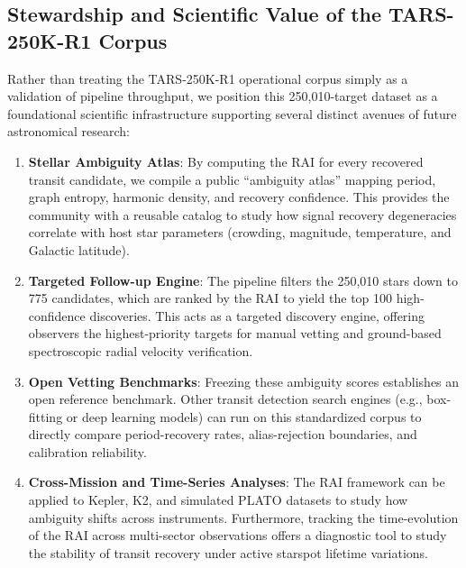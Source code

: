\subsection{Stewardship and Scientific Value of the TARS-250K-R1 Corpus} \label{sec:disc_corpus_value}
Rather than treating the TARS-250K-R1 operational corpus simply as a validation of pipeline throughput, we position this 250,010-target dataset as a foundational scientific infrastructure supporting several distinct avenues of future astronomical research:
\begin{enumerate}
\item \textbf{Stellar Ambiguity Atlas}: By computing the RAI for every recovered transit candidate, we compile a public ``ambiguity atlas'' mapping period, graph entropy, harmonic density, and recovery confidence. This provides the community with a reusable catalog to study how signal recovery degeneracies correlate with host star parameters (crowding, magnitude, temperature, and Galactic latitude).
\item \textbf{Targeted Follow-up Engine}: The pipeline filters the 250,010 stars down to 775 candidates, which are ranked by the RAI to yield the top 100 high-confidence discoveries. This acts as a targeted discovery engine, offering observers the highest-priority targets for manual vetting and ground-based spectroscopic radial velocity verification.
\item \textbf{Open Vetting Benchmarks}: Freezing these ambiguity scores establishes an open reference benchmark. Other transit detection search engines (e.g., box-fitting or deep learning models) can run on this standardized corpus to directly compare period-recovery rates, alias-rejection boundaries, and calibration reliability.
\item \textbf{Cross-Mission and Time-Series Analyses}: The RAI framework can be applied to Kepler, K2, and simulated PLATO datasets to study how ambiguity shifts across instruments. Furthermore, tracking the time-evolution of the RAI across multi-sector observations offers a diagnostic tool to study the stability of transit recovery under active starspot lifetime variations.
\end{enumerate}


